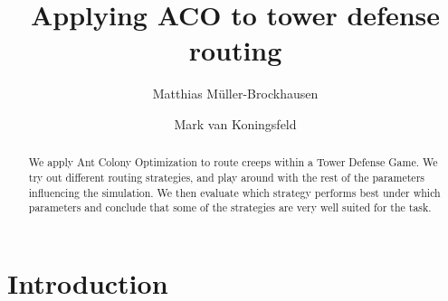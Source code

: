 \documentclass[runningheads,a4paper]{llncs}
\begin{document}
\mainmatter  %

\title{Applying ACO to tower defense routing}


%
%
\author{Matthias Müller-Brockhausen \and Mark van Koningsfeld}
%


%
%

\maketitle


\begin{abstract}
We apply Ant Colony Optimization to route creeps within a Tower Defense Game. We try out different routing strategies, and play around with the rest of the parameters influencing the simulation. We then evaluate which strategy performs best under which parameters and conclude that some of the strategies are very well suited for the task.
\end{abstract}




\section{Introduction}
\label{sec:introduction}


\end{document}
